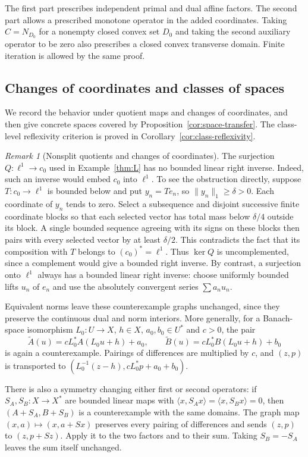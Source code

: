 \documentclass[11pt]{article}
\newcommand{\pair}[2]{\langle #1,#2\rangle}
\theoremstyle{definition}
\theoremstyle{remark}
\newtheorem{remark}{Remark}
\begin{document}
The first part prescribes independent primal and dual affine factors. The second part allows a prescribed monotone operator in the added coordinates. Taking $C=N_{D_0}$ for a nonempty closed convex set $D_0$ and taking the second auxiliary operator to be zero also prescribes a closed convex transverse domain. Finite iteration is allowed by the same proof.

\subsection{Changes of coordinates and classes of spaces}
\label{subsec:appendix-space-classes}

We record the behavior under quotient maps and changes of coordinates, and then give concrete spaces covered by Proposition~\ref{cor:space-transfer}. The class-level reflexivity criterion is proved in Corollary~\ref{cor:class-reflexivity}.

\begin{remark}[Nonsplit quotients and changes of coordinates]
\label{rem:pullback-geometric-instances}
The surjection $Q:\ell^1\to c_0$ used in Example~\ref{thm:L} has no bounded linear right inverse. Indeed, such an inverse would embed $c_0$ into $\ell^1$. To see the obstruction directly, suppose $T:c_0\to\ell^1$ is bounded below and put $y_n=Te_n$, so $\|y_n\|_1\ge\delta>0$. Each coordinate of $y_n$ tends to zero. Select a subsequence and disjoint successive finite coordinate blocks so that each selected vector has total mass below $\delta/4$ outside its block. A single bounded sequence agreeing with its signs on these blocks then pairs with every selected vector by at least $\delta/2$. This contradicts the fact that its composition with $T$ belongs to $(c_0)^*=\ell^1$. Thus $\ker Q$ is uncomplemented, since a complement would give a bounded right inverse. By contrast, a surjection onto $\ell^1$ always has a bounded linear right inverse: choose uniformly bounded lifts $u_n$ of $e_n$ and use the absolutely convergent series $\sum a_nu_n$.

Equivalent norms leave these counterexample graphs unchanged, since they preserve the continuous dual and norm interiors. More generally, for a Banach-space isomorphism $L_0:U\to X$, $h\in X$, $a_0,b_0\in U^*$ and $c>0$, the pair
\[
\widetilde A(u)=cL_0^*A(L_0u+h)+a_0,
\qquad
\widetilde B(u)=cL_0^*B(L_0u+h)+b_0
\]
is again a counterexample. Pairings of differences are multiplied by $c$, and $(z,p)$ is transported to $(L_0^{-1}(z-h),cL_0^*p+a_0+b_0)$.

There is also a symmetry changing either first or second operators: if $S_A,S_B:X\to X^*$ are bounded linear maps with $\pair{x}{S_Ax}=\pair{x}{S_Bx}=0$, then $(A+S_A,B+S_B)$ is a counterexample with the same domains. The graph map $(x,a)\mapsto(x,a+Sx)$ preserves every pairing of differences and sends $(z,p)$ to $(z,p+Sz)$. Apply it to the two factors and to their sum. Taking $S_B=-S_A$ leaves the sum itself unchanged.
\end{remark}
\end{document}
